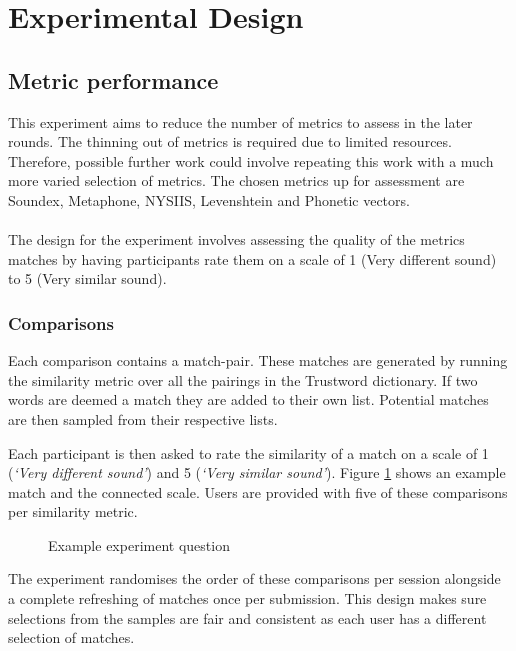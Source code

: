 \section{Experimental Design}

\subsection{Metric performance}
This experiment aims to reduce the number of metrics to assess in the later rounds. The thinning out of metrics is required due to limited resources. Therefore, possible further work could involve repeating this work with a much more varied selection of metrics. The chosen metrics up for assessment are Soundex, Metaphone, NYSIIS, Levenshtein and Phonetic vectors.
\\\\
The design for the experiment involves assessing the quality of the metrics matches by having participants rate them on a scale of 1 (Very different sound) to 5 (Very similar sound).

\subsubsection*{Comparisons}
Each comparison contains a match-pair. These matches are generated by running the similarity metric over all the pairings in the Trustword dictionary. If two words are deemed a match they are added to their own list. Potential matches are then sampled from their respective lists.

Each participant is then asked to rate the similarity of a match on a scale of 1 (\textit{`Very different sound'}) and 5 (\textit{`Very similar sound'}). Figure \ref{fig:phoneticMatch} shows an example match and the connected scale. Users are provided with five of these comparisons per similarity metric.

\begin{figure}[h!]
    \centering
    \begin{adjustbox}{width=0.5\textwidth,center}
    \end{adjustbox}
    \caption{Example experiment question}
    \label{fig:phoneticMatch}
\end{figure}

The experiment randomises the order of these comparisons per session alongside a complete refreshing of matches once per submission. This design makes sure selections from the samples are fair and consistent as each user has a different selection of matches.

